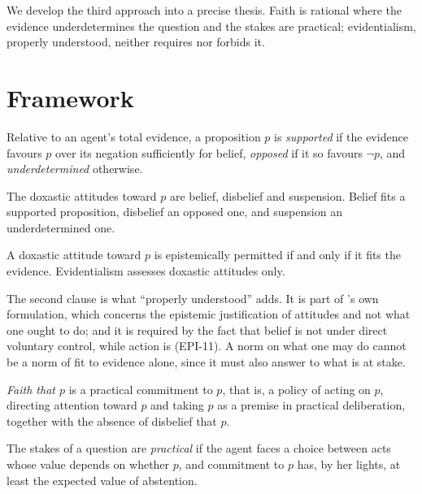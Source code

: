 \documentclass{situationist-preprint}
\begin{document}
We develop the third approach into a precise thesis. Faith is rational where the evidence underdetermines the question and the stakes are practical; evidentialism, properly understood, neither requires nor forbids it.

\section{Framework}

\begin{definition}\label{d:status}
Relative to an agent's total evidence, a proposition $p$ is \emph{supported} if the evidence favours $p$ over its negation sufficiently for belief, \emph{opposed} if it so favours $\neg p$, and \emph{underdetermined} otherwise.
\end{definition}

\begin{definition}[Fit]\label{d:fit}
The doxastic attitudes toward $p$ are belief, disbelief and suspension. Belief fits a supported proposition, disbelief an opposed one, and suspension an underdetermined one.
\end{definition}

\begin{principle}\label{p:ev}
A doxastic attitude toward $p$ is epistemically permitted if and only if it fits the evidence. Evidentialism assesses doxastic attitudes only.
\end{principle}

The second clause is what \enquote{properly understood} adds. It is part of \citeauthor{ConeeFeldman1985}'s own formulation, which concerns the epistemic justification of attitudes and not what one ought to do; and it is required by the fact that belief is not under direct voluntary control, while action is (EPI-11). A norm on what one may do cannot be a norm of fit to evidence alone, since it must also answer to what is at stake.

\begin{definition}[Faith]\label{d:faith}
\emph{Faith that $p$} is a practical commitment to $p$, that is, a policy of acting on $p$, directing attention toward $p$ and taking $p$ as a premise in practical deliberation, together with the absence of disbelief that $p$.
\end{definition}

\begin{definition}\label{d:stakes}
The stakes of a question are \emph{practical} if the agent faces a choice between acts whose value depends on whether $p$, and commitment to $p$ has, by her lights, at least the expected value of abstention.
\end{definition}
\end{document}

